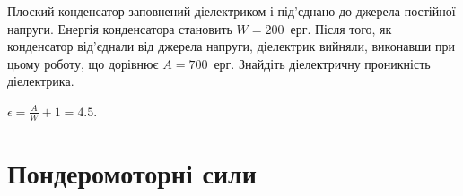 \begin{problem}
    Плоский конденсатор заповнений діелектриком і під'єднано до джерела постійної напруги. Енергія конденсатора становить $W = 200$~ерг. Після того, як конденсатор від'єднали від джерела напруги, діелектрик вийняли, виконавши при цьому роботу, що дорівнює $A  = 700$~ерг. Знайдіть діелектричну проникність діелектрика.
\begin{solution}
	$\epsilon = \frac{A}{W} + 1 = 4.5$.
\end{solution}
\end{problem}

\section{Пондеромоторні сили}

